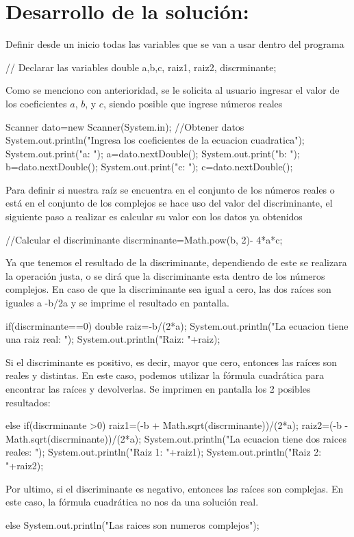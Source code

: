 \documentclass{IEEEcsmag}
\begin{document}
\section*{Desarrollo de la solución:}
Definir desde un inicio todas las variables que se van a usar dentro del programa
\begin{javaCode}
// Declarar las variables
        double a,b,c, raiz1, raiz2, discrminante;
\end{javaCode}
Como se menciono con anterioridad, se le solicita al usuario ingresar el valor de los coeficientes \(a\), \(b\), y \(c\), siendo posible que ingrese números reales 
\begin{javaCode}
Scanner dato=new Scanner(System.in);
        //Obtener datos
        System.out.println("Ingresa los coeficientes de la ecuacion cuadratica");
        System.out.print("a: ");
        a=dato.nextDouble();
        System.out.print("b: ");
        b=dato.nextDouble();
        System.out.print("c: ");
        c=dato.nextDouble();
\end{javaCode}
Para definir si nuestra raíz se encuentra en el conjunto de los números reales o está en el conjunto de los complejos se hace uso del valor del discriminante, el siguiente paso a realizar es calcular su valor con los datos ya obtenidos
\begin{javaCode}
//Calcular el discriminante
        discrminante=Math.pow(b, 2)- 4*a*c;
\end{javaCode}
Ya que tenemos el resultado de la discriminante, dependiendo de este se realizara la operación justa, o se dirá que la discriminante esta dentro de los números complejos.
En caso de que la discriminante sea igual a cero, las dos raíces son iguales a -b/2a y se imprime el resultado en pantalla.
\begin{javaCode}
    if(discrminante==0){
          double  raiz=-b/(2*a);
            System.out.println("La ecuacion tiene una raiz real: ");
            System.out.println("Raiz: "+raiz);
        }
\end{javaCode}
Si el discriminante es positivo, es decir, mayor que cero, entonces las raíces son reales y distintas. En este caso, podemos utilizar la fórmula cuadrática para encontrar las raíces y devolverlas. Se imprimen en pantalla los 2 posibles resultados:
\begin{javaCode}
    else if(discrminante >0){
            raiz1=(-b + Math.sqrt(discrminante))/(2*a);
            raiz2=(-b - Math.sqrt(discrminante))/(2*a);
            System.out.println("La ecuacion tiene dos raices reales: ");
            System.out.println("Raiz 1: "+raiz1);
            System.out.println("Raiz 2: "+raiz2);
        }
\end{javaCode}
Por ultimo, si el discriminante es negativo, entonces las raíces son complejas. En este caso, la fórmula cuadrática no nos da una solución real. 
\begin{javaCode}
  else{
            System.out.println("Las raices son numeros complejos");
        } 
\end{javaCode}
\end{document}
